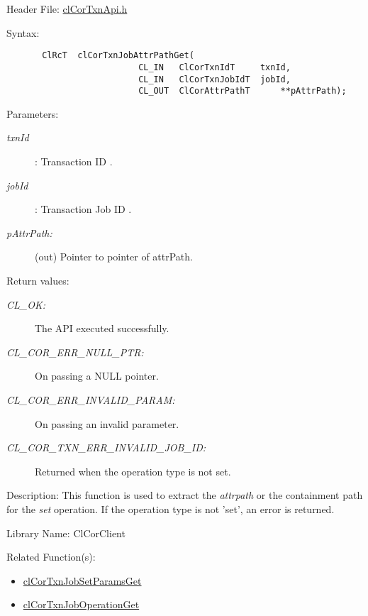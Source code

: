 \begin{Desc}
\item[Header File:]\hyperlink{cl_cor_txn_api_8h}{cl\-Cor\-Txn\-Api.h}\end{Desc}
\begin{Desc}
\item[Syntax:]

\footnotesize\begin{verbatim}       ClRcT  clCorTxnJobAttrPathGet(
                          CL_IN   ClCorTxnIdT     txnId,
                          CL_IN   ClCorTxnJobIdT  jobId,
                          CL_OUT  ClCorAttrPathT      **pAttrPath);
\end{verbatim}
\normalsize
\end{Desc}
\begin{Desc}
\item[Parameters:]
\begin{description}
\item[{\em txn\-Id}]: Transaction ID . \item[{\em job\-Id}]: Transaction Job ID . \item[{\em p\-Attr\-Path:}](out) Pointer to pointer of attr\-Path.\end{description}
\end{Desc}
\begin{Desc}
\item[Return values:]
\begin{description}
\item[{\em CL\_\-OK:}]The API executed successfully. \item[{\em CL\_\-COR\_\-ERR\_\-NULL\_\-PTR:}]On passing a NULL pointer. \item[{\em CL\_\-COR\_\-ERR\_\-INVALID\_\-PARAM:}]On passing an invalid parameter. \item[{\em CL\_\-COR\_\-TXN\_\-ERR\_\-INVALID\_\-JOB\_\-ID:}]Returned when the operation type is not set.\end{description}
\end{Desc}
\begin{Desc}
\item[Description:]This function is used to extract the {\em attrpath\/} or the containment path for the {\em set\/} operation. If the operation type is not 'set', an error is returned.\end{Desc}
\begin{Desc}
\item[Library Name:]Cl\-Cor\-Client\end{Desc}
\begin{Desc}
\item[Related Function(s):]\begin{itemize}
\item \hyperlink{group__group13}{cl\-Cor\-Txn\-Job\-Set\-Params\-Get} \item \hyperlink{group__group13}{cl\-Cor\-Txn\-Job\-Operation\-Get} \end{itemize}
\end{Desc}

